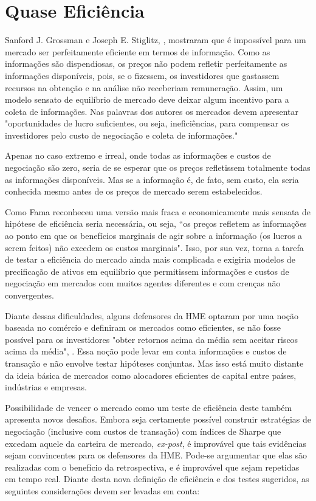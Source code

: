 \chapter{Quase Eficiência}
\label{cap:grossman}

Sanford J. Grossman e Joseph E. Stiglitz, , mostraram que é impossível para um mercado ser perfeitamente eficiente em termos de informação. Como as informações são dispendiosas, os preços não podem refletir perfeitamente as informações disponíveis, pois, se o fizessem, os investidores que gastassem recursos na obtenção e na análise não receberiam remuneração. Assim, um modelo sensato de equilíbrio de mercado deve deixar algum incentivo para a coleta de informações. Nas palavras dos autores os mercados devem apresentar "oportunidades de lucro suficientes, ou seja, ineficiências, para compensar os investidores pelo custo de negociação e coleta de informações."

Apenas no caso extremo e irreal, onde todas as informações e custos de negociação são zero, seria de se esperar que os preços refletissem totalmente todas as informações disponíveis. Mas se a informação é, de fato, sem custo, ela seria conhecida mesmo antes de os preços de mercado serem estabelecidos.

Como Fama reconheceu uma versão mais fraca e economicamente mais sensata de hipótese de eficiência seria necessária, ou seja, “os preços refletem as informações ao ponto em que os benefícios marginais de agir sobre a informação (os lucros a serem feitos) não excedem os custos marginais". Isso, por sua vez, torna a tarefa de testar a eficiência do mercado ainda mais complicada e exigiria modelos de precificação de ativos em equilíbrio que permitissem informações e custos de negociação em mercados com muitos agentes diferentes e com crenças não convergentes.

Diante dessas dificuldades, alguns defensores da HME optaram por uma noção baseada no comércio e definiram os mercados como eficientes, se não fosse possível para os investidores "obter retornos acima da média sem aceitar riscos acima da média", . Essa noção pode levar em conta informações e custos de transação e não envolve testar hipóteses conjuntas. Mas isso está muito distante da ideia básica de mercados como alocadores eficientes de capital entre países, indústrias e empresas.

Possibilidade de vencer o mercado como um teste de eficiência deste também apresenta novos desafios. Embora seja certamente possível construir estratégias de negociação (inclusive com custos de transação) com índices de Sharpe que excedam aquele da carteira de mercado, \emph{ex-post}, é improvável que tais evidências sejam convincentes para os defensores da HME. Pode-se argumentar que elas são realizadas com o benefício da retrospectiva, e é improvável que sejam repetidas em tempo real. Diante desta nova definição de eficiência e dos testes sugeridos, as seguintes considerações devem ser levadas em conta:

